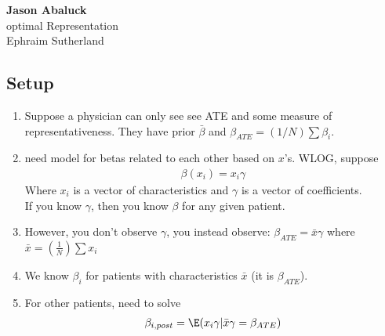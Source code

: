 



\begin{center}
	{\large \bf Jason Abaluck }   \\ \large optimal Representation \\ Ephraim Sutherland
\end{center}

\subsection*{Setup}

\begin{enumerate}

	\item  Suppose a physician can only see see ATE and some measure of representativeness. They have prior
		$\bar{\beta}$ and  $\beta_{ATE} = (1/N) \sum \beta_{i}$.

	\item need model for betas related to each other based on $x$'s.
		WLOG, suppose
		\begin{align*}
			\beta(x_i) = x_i \gamma
		\end{align*} 
		Where $x_i$ is a vector of characteristics and $\gamma$ is a vector of coefficients. \\
		If you know $\gamma$, then you know $\beta$ for any given patient.
	\item However, you don't observe $\gamma$, you instead observe:
		$\beta_{ATE} = \bar x \gamma$ where $\bar x = (\frac{1}{N}) \sum x_i$
	\item We know $\beta_i$ for patients with characteristics $\bar x$ (it is $\beta_{ATE}$).
	\item For other patients, need to solve
		\begin{align*}
			\beta_{i,post} = \E(x_i \gamma | \bar x \gamma = \beta_{ATE})
		\end{align*} 


\end{enumerate}
